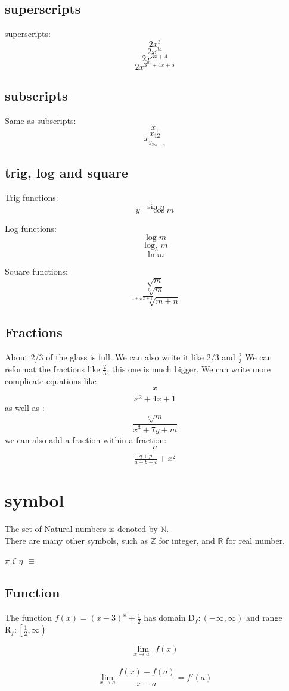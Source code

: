 \documentclass[11pt]{article}
\theoremstyle{definition}
\begin{document}
	\subsection{superscripts}
superscripts:
$$2x^3 $$
$$2x^34 $$
$$2x^{3x + 4} $$
$$2x^{3^m + 4x + 5} $$
	\subsection{subscripts}
Same as subscripts:
$$x_1 $$
$$x_{12}$$
$$x_{y_{3m +n}} $$
	\subsection{trig, log and square}
Trig functions:
$$\sin{n} $$
$$y = \cos{m} $$

Log functions:
$$\log{m} $$
$$\log_5{m} $$
$$\ln{m} $$

Square functions:
$$\sqrt{m}$$
$$\sqrt[n]{m} $$
$$\sqrt[1 + \sqrt{x+1}]{m+n}$$
	\subsection{Fractions}
About 2/3 of the glass is full. We can also write it like $2/3$ and $\frac{2}{3}$ We can reformat the fractions like $\displaystyle{\frac{2}{3}}$, this one is much bigger. We can write more complicate equations like $$\frac{x}{x^2+4x+1}$$ as well as : $$\frac{\sqrt[n]{m}}{x^3+7y+m}$$we can also add a fraction within a fraction:$$\frac{n}{\frac{q+p}{a+b+c} + x^2}$$

\section{symbol}
The set of Natural numbers is denoted by $\mathbb{N}$. \\
There are many other symbols, such as $\mathbb{Z}$ for integer, and $\mathbb{R}$ for real number.

$\pi$
$\zeta$
$\eta$
$\equiv$

	\subsection{Function}
The function $\displaystyle{f(x)=(x-3)^x+\frac{1}{2}}$ has domain $\mathrm{D}_f:(-\infty,\infty)$ and range $\mathrm{R}_f:\left[\frac{1}{2},\infty\right)$

$$\lim \limits_{x \to a^-}f(x)$$\\

$$\displaystyle{\lim \limits_{x \to a}\frac{f(x)-f(a)}{x-a}=f'(a)}$$\\
\end{document}
